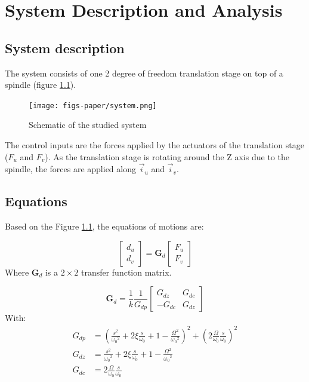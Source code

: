 \documentclass[a4paper, 10pt, DIV=12, parskip=full]{scrreprt}
\begin{document}
\chapter{System Description and Analysis}
\label{sec:org866deeb}
\label{sec:system_description}

\section{System description}
\label{sec:org597d9d5}
The system consists of one 2 degree of freedom translation stage on top of a spindle (figure \ref{fig:system}).

\begin{figure}[htbp]
\centering
\texttt{[image: figs-paper/system.png]}
\caption{\label{fig:system}Schematic of the studied system}
\end{figure}

The control inputs are the forces applied by the actuators of the translation stage (\(F_u\) and \(F_v\)).
As the translation stage is rotating around the Z axis due to the spindle, the forces are applied along \(\vec{i}_u\) and \(\vec{i}_v\).

\section{Equations}
\label{sec:orge2ee0c6}
Based on the Figure \ref{fig:system}, the equations of motions are:
\begin{important}
\begin{equation}
\begin{bmatrix} d_u \\ d_v \end{bmatrix} =
\bm{G}_d
\begin{bmatrix} F_u \\ F_v \end{bmatrix}
\end{equation}
Where \(\bm{G}_d\) is a \(2 \times 2\) transfer function matrix.

\begin{equation}
\bm{G}_d = \frac{1}{k} \frac{1}{G_{dp}}
\begin{bmatrix}
   G_{dz} & G_{dc} \\
  -G_{dc} & G_{dz}
\end{bmatrix}
\end{equation}
With:
\begin{align}
  G_{dp} &= \left( \frac{s^2}{{\omega_0}^2} + 2 \xi \frac{s}{\omega_0} + 1 - \frac{{\Omega}^2}{{\omega_0}^2} \right)^2 + \left( 2 \frac{\Omega}{\omega_0} \frac{s}{\omega_0} \right)^2 \\
  G_{dz} &= \frac{s^2}{{\omega_0}^2} + 2 \xi \frac{s}{\omega_0} + 1 - \frac{{\Omega}^2}{{\omega_0}^2} \\
  G_{dc} &= 2 \frac{\Omega}{\omega_0} \frac{s}{\omega_0}
\end{align}
\end{important}
\end{document}
